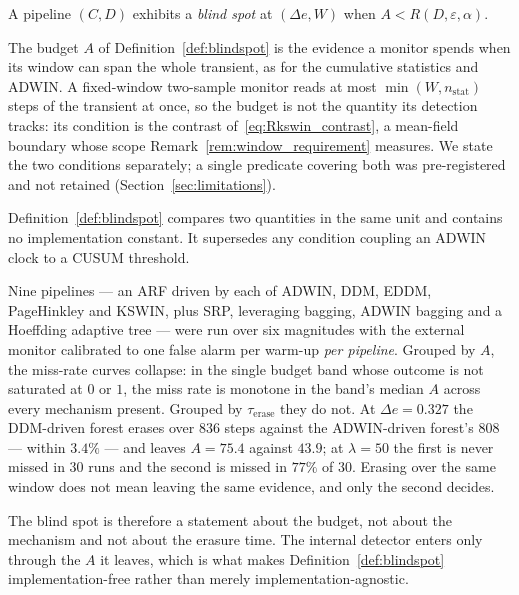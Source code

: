\begin{definition}\label{def:blindspot}
  A pipeline $(C, D)$ exhibits a \emph{blind spot} at $(\Delta e, W)$ when
  $A < R(D, \varepsilon, \alpha)$.
\end{definition}

\begin{remark}\label{rem:predicate_scope}
  The budget $A$ of Definition~\ref{def:blindspot} is the evidence a monitor
  spends when its window can span the whole transient, as for the cumulative
  statistics and ADWIN. A fixed-window two-sample monitor reads at most
  $\min(W, n_{\mathrm{stat}})$ steps of the transient at once, so the budget is
  not the quantity its detection tracks: its condition is the contrast
  of~\eqref{eq:Rkswin_contrast}, a mean-field boundary whose scope
  Remark~\ref{rem:window_requirement} measures. We state the two conditions
  separately; a single predicate covering both was pre-registered and not
  retained (Section~\ref{sec:limitations}).
\end{remark}

Definition~\ref{def:blindspot} compares two quantities in the same unit and
contains no implementation constant. It supersedes any condition coupling an
ADWIN clock to a CUSUM threshold.

\begin{empresult}\label{res:budget_sufficient}
  Nine pipelines --- an ARF driven by each of ADWIN, DDM, EDDM, PageHinkley and
  KSWIN, plus SRP, leveraging bagging, ADWIN bagging and a Hoeffding adaptive
  tree --- were run over six magnitudes with the external monitor calibrated to
  one false alarm per warm-up \emph{per pipeline}. Grouped by $A$, the miss-rate
  curves collapse: in the single budget band whose outcome is not saturated at
  $0$ or $1$, the miss rate is monotone in the band's median $A$ across every
  mechanism present. Grouped by $\tau_{\mathrm{erase}}$ they do not. At
  $\Delta e = 0.327$ the DDM-driven forest erases over $836$ steps against the
  ADWIN-driven forest's $808$ --- within $3.4\%$ --- and leaves $A = 75.4$
  against $43.9$; at $\lambda = 50$ the first is never missed in $30$ runs and
  the second is missed in $77\%$ of $30$. Erasing over the same window does not
  mean leaving the same evidence, and only the second decides.
\end{empresult}

The blind spot is therefore a statement about the budget, not about the
mechanism and not about the erasure time. The internal detector enters only
through the $A$ it leaves, which is what makes
Definition~\ref{def:blindspot} implementation-free rather than merely
implementation-agnostic.

